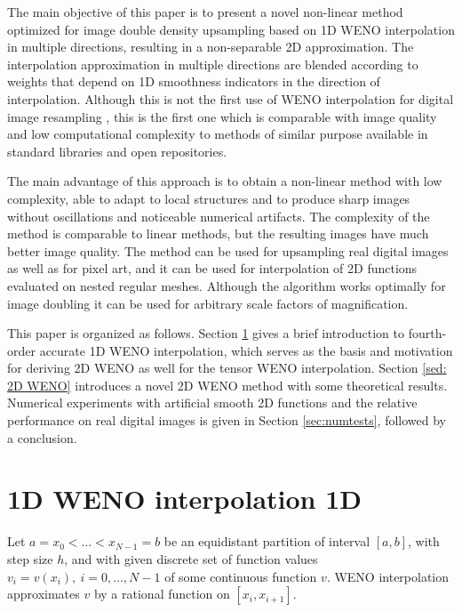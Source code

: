 The main objective of this paper is to present a novel non-linear method optimized for image double density upsampling based on 1D WENO interpolation in multiple directions, resulting in a non-separable 2D approximation. The interpolation approximation in multiple directions are blended according to weights that depend on 1D smoothness indicators %
in the direction of interpolation. Although this is not the first use of WENO interpolation for digital image resampling \cite{ImageZooming,ARANDIGA2012,Mulet_2010}, this is the first one which is comparable with image quality and low computational complexity to methods of similar purpose available in standard libraries and open repositories.  


The main advantage of this approach is to obtain a non-linear method with low complexity, able to adapt to local structures and to produce sharp images without oscillations and noticeable numerical artifacts. The complexity of the method is comparable to linear methods, but the resulting images have much better image quality. The method can be used for upsampling real digital images as well as for pixel art, and it can be used for interpolation of 2D functions evaluated on nested regular meshes. Although the algorithm works optimally for image doubling it can be used for arbitrary scale factors of magnification.

This paper is organized as follows. Section \ref{sec Interpolation} gives a brief introduction to fourth-order accurate 1D WENO interpolation, which serves as the basis and motivation for deriving 2D WENO as well for the tensor WENO interpolation. Section \ref{sed: 2D WENO} introduces a novel 2D WENO method with some theoretical results. Numerical experiments with artificial smooth 2D functions and the relative performance on real digital images is given in Section \ref{sec:numtests}, followed by a conclusion.


	\section{1D WENO interpolation 1D}
	\label{sec Interpolation}
	
	Let $a=x_{0}< \ldots <x_{N-1}=b$ be an equidistant partition of interval $[a,b]$, with step size $h$, and with given discrete set of function values $v_i=v(x_i),\: i=0, \ldots,N-1$  of some continuous function $v$. 
	WENO interpolation approximates $v$ by a rational function on $[x_i,x_{i+1}]$. 
	
